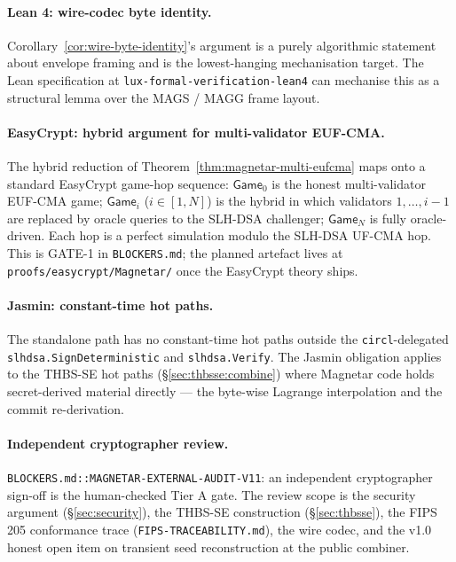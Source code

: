 \paragraph{Lean 4: wire-codec byte identity.}
Corollary~\ref{cor:wire-byte-identity}'s argument is a purely
algorithmic statement about envelope framing and is the
lowest-hanging mechanisation target. The Lean specification at
\texttt{lux-formal-verification-lean4} \cite{lp-lean4} can
mechanise this as a structural lemma over the MAGS / MAGG
frame layout.

\paragraph{EasyCrypt: hybrid argument for multi-validator
EUF-CMA.} The hybrid reduction of
Theorem~\ref{thm:magnetar-multi-eufcma} maps onto a standard
EasyCrypt \cite{easycrypt} game-hop sequence: $\mathsf{Game}_0$
is the honest multi-validator EUF-CMA game; $\mathsf{Game}_i$
($i \in [1, N]$) is the hybrid in which validators
$1, \ldots, i-1$ are replaced by oracle queries to the SLH-DSA
challenger; $\mathsf{Game}_N$ is fully oracle-driven. Each hop
is a perfect simulation modulo the SLH-DSA UF-CMA hop. This is
GATE-1 in \texttt{BLOCKERS.md}; the planned artefact lives at
\texttt{proofs/easycrypt/Magnetar/} once the EasyCrypt theory
ships.

\paragraph{Jasmin: constant-time hot paths.} The standalone
path has no constant-time hot paths outside the
\texttt{circl}-delegated \texttt{slhdsa.SignDeterministic} and
\texttt{slhdsa.Verify}. The Jasmin \cite{jasmin} obligation
applies to the THBS-SE hot paths
(\S\ref{sec:thbsse:combine}) where Magnetar code holds
secret-derived material directly --- the byte-wise Lagrange
interpolation and the commit re-derivation.

\paragraph{Independent cryptographer review.}
\texttt{BLOCKERS.md::MAGNETAR-EXTERNAL-AUDIT-V11}: an
independent cryptographer sign-off is the human-checked Tier A
gate. The review scope is the security argument
(\S\ref{sec:security}), the THBS-SE construction
(\S\ref{sec:thbsse}), the FIPS 205 conformance trace
(\texttt{FIPS-TRACEABILITY.md}), the wire codec, and the
v1.0 honest open item on transient seed reconstruction at the
public combiner.

